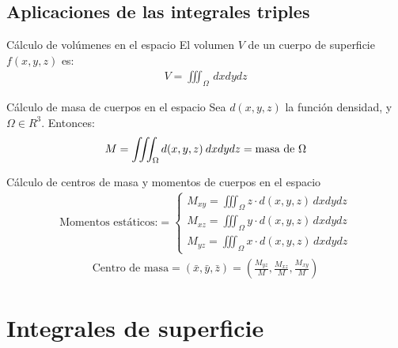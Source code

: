 \documentclass[a4paper, twoside]{article}
\numberwithin{equation}{section}
\numberwithin{figure}{section}
\numberwithin{table}{section}
\begin{document}
\subsection{Aplicaciones de las integrales triples}
\begin{corolario*}{Cálculo de volúmenes en el espacio}
	El volumen $V$ de un cuerpo de superficie $f(x,y,z)$ es:
	\begin{align}
		V=\iiint_{\Omega}\, dxdydz
	\end{align}
\end{corolario*}

\begin{corolario*}{Cálculo de masa de cuerpos en el espacio}
	Sea $d(x,y,z)$ la función densidad, y $\Omega \in R^3$. Entonces:
	\begin{align}
		M=\iiint_{\Omega}d(x,y,z)\: dxdydz=\mbox{masa de \ensuremath{\Omega}}
	\end{align}
\end{corolario*}

\begin{corolario*}{Cálculo de centros de masa y momentos de cuerpos en el espacio}
	\begin{align}
		\text{Momentos estáticos:}
		=\begin{cases}
		M_{xy}=\iiint_{\Omega}z\cdot d(x,y,z)\, dxdydz\\
		M_{xz}=\iiint_{\Omega}y\cdot d(x,y,z)\, dxdydz\\
		M_{yz}=\iiint_{\Omega}x\cdot d(x,y,z)\, dxdydz\end{cases}
	\end{align}
	\begin{align}
		\text{Centro de masa}=(\bar{x},\bar{y},\bar{z})=\left(\frac{M_{yz}}{M},\frac{M_{xz}}{M},\frac{M_{xy}}{M}\right)
	\end{align}
\end{corolario*}

\newpage
\section{Integrales de superficie}
\end{document}
